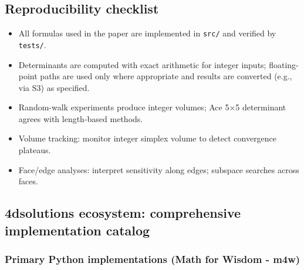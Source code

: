 \documentclass[
]{article}
\providecommand{\tightlist}{%
  \setlength{\itemsep}{0pt}\setlength{\parskip}{0pt}}
\begin{document}
\hypertarget{reproducibility-checklist}{%
\subsection{Reproducibility checklist}\label{reproducibility-checklist}}

\begin{itemize}
\tightlist
\item
  All formulas used in the paper are implemented in \texttt{src/} and
  verified by \texttt{tests/}.
\item
  Determinants are computed with exact arithmetic for integer inputs;
  floating-point paths are used only where appropriate and results are
  converted (e.g., via S3) as specified.
\item
  Random-walk experiments produce integer volumes; Ace 5×5 determinant
  agrees with length-based methods.
\item
  Volume tracking: monitor integer simplex volume to detect convergence
  plateaus.
\item
  Face/edge analyses: interpret sensitivity along edges; subspace
  searches across faces.
\end{itemize}

\hypertarget{dsolutions-ecosystem-comprehensive-implementation-catalog}{%
\subsection{4dsolutions ecosystem: comprehensive implementation
catalog}\label{dsolutions-ecosystem-comprehensive-implementation-catalog}}

\hypertarget{primary-python-implementations-math-for-wisdom---m4w}{%
\subsubsection{Primary Python implementations (Math for Wisdom -
m4w)}\label{primary-python-implementations-math-for-wisdom---m4w}}
\end{document}
